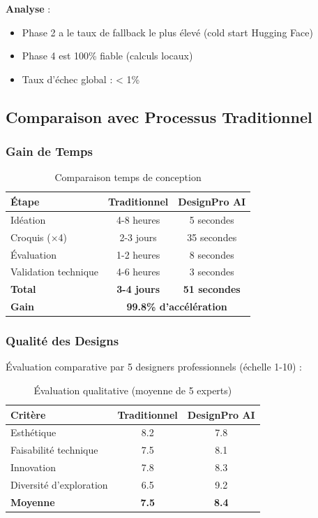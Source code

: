\textbf{Analyse} :
\begin{itemize}[leftmargin=*]
    \item Phase 2 a le taux de fallback le plus élevé (cold start Hugging Face)
    \item Phase 4 est 100\% fiable (calculs locaux)
    \item Taux d'échec global : < 1\%
\end{itemize}

\subsection{Comparaison avec Processus Traditionnel}

\subsubsection{Gain de Temps}

\begin{table}[H]
\centering
\caption{Comparaison temps de conception}
\label{tab:time_comparison}
\begin{tabular}{@{}lcc@{}}
\toprule
\textbf{Étape} & \textbf{Traditionnel} & \textbf{DesignPro AI} \\ 
\midrule
Idéation & 4-8 heures & 5 secondes \\
Croquis (×4) & 2-3 jours & 35 secondes \\
Évaluation & 1-2 heures & 8 secondes \\
Validation technique & 4-6 heures & 3 secondes \\
\midrule
\textbf{Total} & \textbf{3-4 jours} & \textbf{51 secondes} \\
\textbf{Gain} & \multicolumn{2}{c}{\textbf{99.8\% d'accélération}} \\
\bottomrule
\end{tabular}
\end{table}

\subsubsection{Qualité des Designs}

Évaluation comparative par 5 designers professionnels (échelle 1-10) :

\begin{table}[H]
\centering
\caption{Évaluation qualitative (moyenne de 5 experts)}
\label{tab:quality_comparison}
\begin{tabular}{@{}lcc@{}}
\toprule
\textbf{Critère} & \textbf{Traditionnel} & \textbf{DesignPro AI} \\ 
\midrule
Esthétique & 8.2 & 7.8 \\
Faisabilité technique & 7.5 & 8.1 \\
Innovation & 7.8 & 8.3 \\
Diversité d'exploration & 6.5 & 9.2 \\
\midrule
\textbf{Moyenne} & \textbf{7.5} & \textbf{8.4} \\
\bottomrule
\end{tabular}
\end{table}

